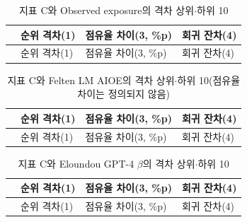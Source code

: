 \documentclass[11pt]{article}
\begin{document}
{\small
\begin{longtable}{R{0.5cm}L{5.4cm}L{5.4cm}L{5.4cm}}
\caption{지표 C와 Observed exposure의 격차 상위$\cdot$하위 10}\label{tab:topOE}\\
\toprule
 & 순위 격차(1) & 점유율 차이(3, \%p) & 회귀 잔차(4) \\
\midrule
\endfirsthead
\toprule
 & 순위 격차(1) & 점유율 차이(3, \%p) & 회귀 잔차(4) \\
\midrule
\endhead

\bottomrule
\end{longtable}

\begin{longtable}{R{0.5cm}L{5.4cm}L{5.4cm}L{5.4cm}}
\caption{지표 C와 Felten LM AIOE의 격차 상위$\cdot$하위 10(점유율 차이는 정의되지 않음)}\label{tab:topFEL}\\
\toprule
 & 순위 격차(1) & 점유율 차이(3, \%p) & 회귀 잔차(4) \\
\midrule
\endfirsthead
\toprule
 & 순위 격차(1) & 점유율 차이(3, \%p) & 회귀 잔차(4) \\
\midrule
\endhead

\bottomrule
\end{longtable}

\begin{longtable}{R{0.5cm}L{5.4cm}L{5.4cm}L{5.4cm}}
\caption{지표 C와 Eloundou GPT-4 $\beta$의 격차 상위$\cdot$하위 10}\label{tab:topELO}\\
\toprule
 & 순위 격차(1) & 점유율 차이(3, \%p) & 회귀 잔차(4) \\
\midrule
\endfirsthead
\toprule
 & 순위 격차(1) & 점유율 차이(3, \%p) & 회귀 잔차(4) \\
\midrule
\endhead

\bottomrule
\end{longtable}
}
\end{document}
